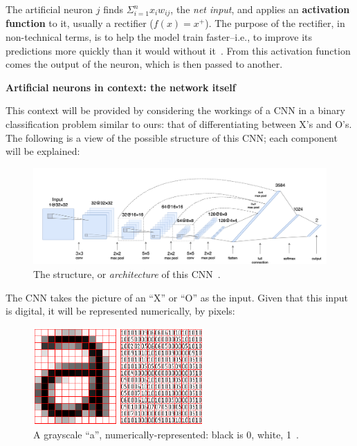 \documentclass[a4paper, 11pt]{article} %
\begin{document}
	The artificial neuron $j$ finds $\Sigma_{i = 1}^{n}x_{i}w_{ij}$, the \textit{net input}, and applies an 
	\textbf{activation function} to it, usually a rectifier ($f(x) = x^+$). The purpose of the rectifier, in 
	non-technical terms, is to help the model train faster--i.e., to improve its predictions more quickly 
	than it would without it~\cite{use-of-relu}. From this activation function comes the output 
	of the neuron, which is then passed to another.

    \hspace*{-6mm}\textbf{Artificial neurons in context: the network itself~\cite{cnn-working}\relax} 
    
    This context will be provided by considering the workings of a CNN in a binary classification 
    problem similar to ours: that of differentiating between X's and O's. The following is a view of the 
    possible structure of this CNN; each component will be explained:

     \begin{figure}[h]
       	\centering
       	\includegraphics[width=14cm]{figures/architecture.png}
       	\caption{The structure, or \textit{architecture} of this CNN~\cite{architecture}\relax.}
       	\label{archi}
    \end{figure}

    The CNN takes the picture of an ``X'' or ``O'' as the input. Given that this input is digital, it will 
    be represented numerically, by pixels:
    \vskip 5mm
    \begin{figure}[h]
       	\centering
       	\includegraphics[width=6.5cm]{figures/pict_num.png}
       	\caption{A grayscale ``a'', numerically-represented: black is 0, white, 1~\cite{pict-num}\relax.}
    \end{figure}
 		
\end{document}
